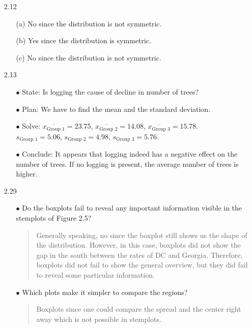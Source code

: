 \documentclass[11pt, a4paper]{article}
\begin{document}
\begin{itemize}
\newpage

\item[2.12]
\begin{itemize}
\item[(a)]
No since the distribution is not symmetric.

\item[]

\item[(b)]
Yes since the distribution is symmetric.

\item[]

\item[(c)]
No since the distribution is not symmetric.
\end{itemize}

\item[]
\item[]

\item[2.13]
\begin{itemize}
\item[$\bullet$]
State: Is logging the cause of decline in number of trees?
\item[$\bullet$]
Plan: We have to find the mean and the standard deviation.
\item[$\bullet$]
Solve:
$\overline{x_{\text{Group 1}}} = 23.75$, $\overline{x_{\text{Group 2}}} = 14.08$, $\overline{x_{\text{Group 3}}} = 15.78$.\\
$s_{\text{Group 1}} = 5.06$, $s_{\text{Group 2}} = 4.98$, $s_{\text{Group 3}} = 5.76$.
\item[$\bullet$]
Conclude: It appears that logging indeed has a negative effect on the number of trees.
If no logging is present, the average number of trees is higher.
\end{itemize}

\item[]
\item[]

\item[2.29]
\begin{itemize}
\item[$\bullet$]
Do the boxplots fail to reveal any important information visible in the stemplots of Figure 2.5?
\begin{quote}
Generally speaking, no since the boxplot still shows us the shape of the distribution.
However, in this case, boxplots did not show the gap in the south between the rates of
DC and Georgia. Therefore, boxplots did not fail to show the general overview, but they
did fail to reveal some particular information.
\end{quote}
\item[$\bullet$]
Which plots make it simpler to compare the regions?
\begin{quote}
Boxplots since one could compare the spread and the center right away which is not
possible in stemplots.
\end{quote}
\end{itemize}


\end{itemize}
\end{document}
